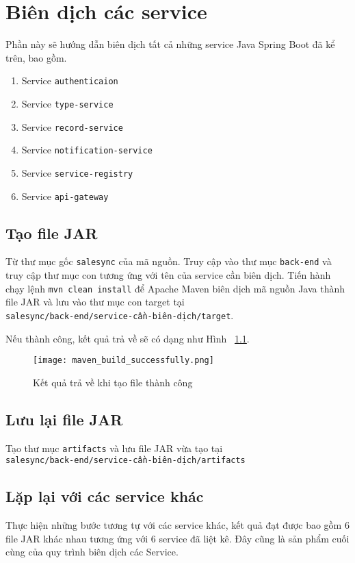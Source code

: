 \chapter{Biên dịch các service}
\label{Chapter2}
Phần này sẽ hướng dẫn biên dịch tất cả những service Java Spring Boot đã kể trên, bao gồm.
\begin{enumerate}
    \item Service \texttt{{authenticaion}}
    \item Service \texttt{type-service}
    \item Service \texttt{record-service}
    \item Service \texttt{notification-service}
    \item Service \texttt{service-registry}
    \item Service \texttt{api-gateway}
\end{enumerate}

\section{Tạo file JAR}
Từ thư mục gốc \texttt{salesync} của mã nguồn. Truy cập vào thư mục \texttt{back-end} và truy cập thư mục con tương ứng với tên của service cần biên dịch.
Tiến hành chạy lệnh \texttt{mvn clean install} để Apache Maven biên dịch mã nguồn Java thành file JAR và lưu vào thư mục con target tại \\
\texttt{salesync/back-end/service-cần-biên-dịch/target}.

Nếu thành công, kết quả trả về sẽ có dạng như Hình ~\ref{fig:maven_build_successfully}.

\begin{figure}
    \centering
    \texttt{[image: maven\_build\_successfully.png]}
    \caption{Kết quả trả về khi tạo file thành công}
    \label{fig:maven_build_successfully}
\end{figure}

\section{Lưu lại file JAR}
Tạo thư mục \texttt{artifacts} và lưu file  JAR vừa tạo tại \\
\texttt{salesync/back-end/service-cần-biên-dịch/artifacts}

\section{Lặp lại với các service khác}
Thực hiện những bước tương tự với các service khác, kết quả đạt được bao gồm $6$ file JAR khác nhau tương ứng với $6$ service đã liệt kê. Đây cũng là sản phẩm cuối cùng của quy trình biên dịch các Service.